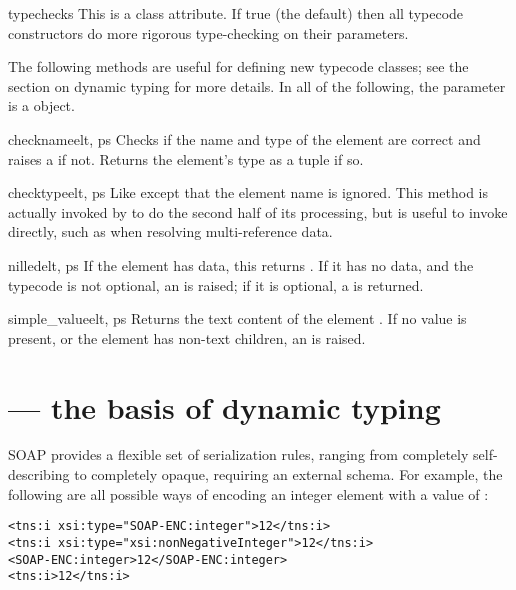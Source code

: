 \begin{memberdesc}{typechecks}
This is a class attribute.
If true (the default) then all typecode constructors do more
rigorous type-checking on their parameters.
\end{memberdesc}

The following methods are useful for defining new typecode classes;
see the section on dynamic typing for more details.
In all of the following, the  parameter is a 
object.

\begin{methoddesc}{checkname}{elt, ps}
Checks if the name and type of the element  are
correct and raises a  if not.
Returns the element's type as a  tuple if so.
\end{methoddesc}

\begin{methoddesc}{checktype}{elt, ps}
Like  except that the element name is ignored.
This method is actually invoked by  to do the
second half of its processing, but is useful to invoke
directly, such as when resolving multi-reference data.
\end{methoddesc}

\begin{methoddesc}{nilled}{elt, ps}
If the element  has data, this returns .
If it has no data, and the typecode is not optional, an
 is raised; if it is optional,
a  is returned.
\end{methoddesc}

\begin{methoddesc}{simple_value}{elt, ps}
Returns the text content of the element .
If no value is present, or the element has non-text children, an
 is raised.
\end{methoddesc}

\section{ --- the basis of dynamic typing}

SOAP provides a flexible set of serialization rules, ranging from
completely self-describing to completely opaque, requiring an external
schema. For example, the following are all possible ways of encoding an
integer element  with a value of :

\begin{verbatim}
<tns:i xsi:type="SOAP-ENC:integer">12</tns:i>
<tns:i xsi:type="xsi:nonNegativeInteger">12</tns:i>
<SOAP-ENC:integer>12</SOAP-ENC:integer>
<tns:i>12</tns:i>
\end{verbatim}

